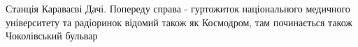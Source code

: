 




Станція Караваєві Дачі. Попереду справа - гуртожиток національного медичного
університету та радіоринок відомий також як Космодром, там починається також
Чоколівський бульвар
